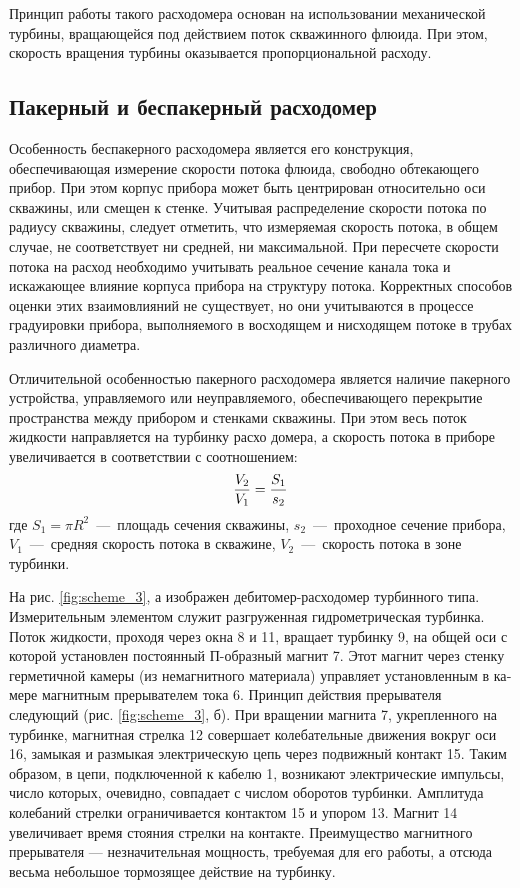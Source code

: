 Принцип работы такого расходомера основан на использовании
механической турбины, вращающейся под действием поток
скважинного флюида. При этом, скорость вращения турбины
оказывается пропорциональной расходу.

\subsection{Пакерный и беспакерный расходомер}

Особенность беспакерного расходомера является его
конструкция, обеспечивающая измерение скорости потока флюида,
свободно обтекающего прибор. При этом корпус прибора может быть
центрирован относительно оси скважины, или смещен к стенке.
Учитывая распределение скорости потока по радиусу скважины,
следует отметить, что измеряемая скорость потока, в общем случае, не
соответствует ни средней, ни максимальной. При пересчете скорости
потока на расход необходимо учитывать реальное сечение канала тока
и искажающее влияние корпуса прибора на структуру потока.
Корректных способов оценки этих взаимовлияний не существует, но
они учитываются в процессе градуировки прибора, выполняемого в
восходящем и нисходящем потоке в трубах различного диаметра.

Отличительной особенностью пакерного расходомера является
наличие пакерного устройства, управляемого или неуправляемого,
обеспечивающего перекрытие пространства между прибором и стенками
скважины. При этом весь поток жидкости направляется на турбинку
расхо домера, а скорость потока в приборе увеличивается в соответствии с
соотношением:
$${V_2 \over V_1} = {S_1 \over s_2}$$
где $S_1 = \pi R^2$~---~площадь сечения скважины,
$s_2$~---~проходное сечение прибора,
$V_1$~---~средняя скорость потока в скважине,
$V_2$~---~скорость потока в зоне турбинки.

На рис. \ref{fig:scheme_3}, а изображен дебитомер-расходомер турбинного типа. Измерительным элементом слу­жит разгруженная гидромет­рическая турбинка. Поток жидко­сти, проходя через окна 8 и 11, вращает турбинку 9, на общей оси с которой установлен постоянный П-образный магнит 7. Этот магнит через стенку герметичной каме­ры (из немагнитного материала) управляет установленным в ка­мере магнитным прерывателем тока 6. Принцип действия преры­вателя следующий (рис. \ref{fig:scheme_3}, б). При вращении магнита 7, укреп­ленного на турбинке, магнитная стрелка 12 совершает колеба­тельные движения вокруг оси 16, замыкая и размыкая электричес­кую цепь через подвижный кон­такт 15. Таким образом, в цепи, подключенной к кабелю 1, возни­кают электрические импульсы, число которых, очевидно, совпа­дает с числом оборотов турбинки. Амплитуда колебаний стрелки ограничивается контактом 15 и упором 13. Магнит 14 увеличи­вает время стояния стрелки на контакте. Преимущество магнитного прерывателя — незначитель­ная мощность, требуемая для его работы, а отсюда весьма неболь­шое тормозящее действие на турбинку.

